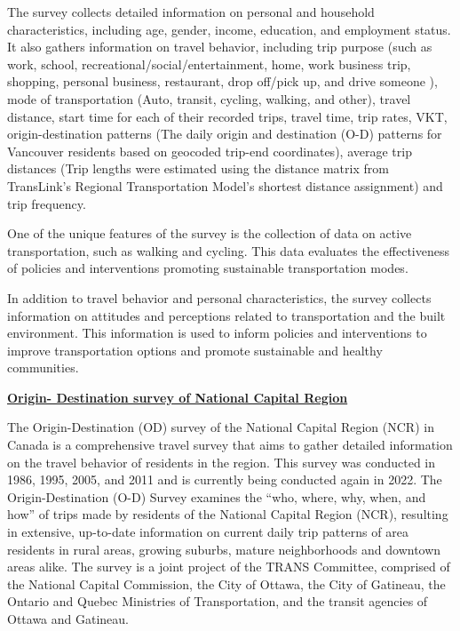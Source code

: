 \documentclass[
11pt, %
oneside, %
english, %
singlespacing, %
]{macthesis} %
\begin{document}
The survey collects detailed information on personal and household characteristics, including age, gender, income, education, and employment status. It also gathers information on travel behavior, including trip purpose (such as work, school, recreational/social/entertainment, home, work business trip, shopping, personal business, restaurant, drop off/pick up, and drive someone ), mode of transportation (Auto, transit, cycling, walking, and other), travel distance, start time for each of their recorded trips, travel time, trip rates, VKT, origin-destination patterns (The daily origin and destination (O-D) patterns for Vancouver residents based on geocoded trip-end coordinates), average trip distances (Trip lengths were estimated using the distance matrix from TransLink's Regional Transportation Model's shortest distance assignment) and trip frequency.

One of the unique features of the survey is the collection of data on active transportation, such as walking and cycling. This data evaluates the effectiveness of policies and interventions promoting sustainable transportation modes.

In addition to travel behavior and personal characteristics, the survey collects information on attitudes and perceptions related to transportation and the built environment. This information is used to inform policies and interventions to improve transportation options and promote sustainable and healthy communities.

\textbf{\href{http://www.ncr-trans-rcn.ca/surveys/o-d-survey}{Origin- Destination survey of National Capital Region}}

The Origin-Destination (OD) survey of the National Capital Region (NCR) in Canada is a comprehensive travel survey that aims to gather detailed information on the travel behavior of residents in the region. This survey was conducted in 1986, 1995, 2005, and 2011 and is currently being conducted again in 2022. The Origin-Destination (O-D) Survey examines the ``who, where, why, when, and how'' of trips made by residents of the National Capital Region (NCR), resulting in extensive, up-to-date information on current daily trip patterns of area residents in rural areas, growing suburbs, mature neighborhoods and downtown areas alike. The survey is a joint project of the TRANS Committee, comprised of the National Capital Commission, the City of Ottawa, the City of Gatineau, the Ontario and Quebec Ministries of Transportation, and the transit agencies of Ottawa and Gatineau.
\end{document}
